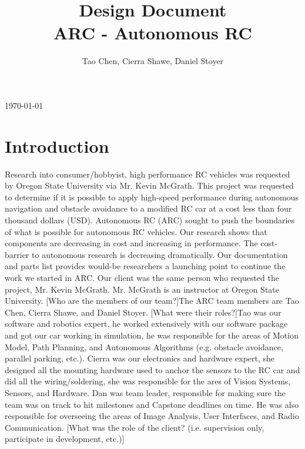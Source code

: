 \documentclass[compsoc,draftclsnofoot,onecolumn,10pt]{IEEEtran}
\date{}
\begin{document}
\begin{titlepage}
	\title{Design Document\\
	ARC - Autonomous RC}
	\author{Tao Chen, Cierra Shawe, Daniel Stoyer}
	\maketitle
	\begin{center}
		\today
	\end{center}

	\thispagestyle{empty} %
	
\end{titlepage}

\tableofcontents

\newpage

\section{Introduction}
Research into consumer/hobbyist, high performance RC vehicles was requested by Oregon State University via Mr. Kevin McGrath. This project was requested to determine if it is possible to apply high-speed performance during autonomous navigation and obstacle avoidance to a modified RC car at a cost less than four thousand dollars (USD). Autonomous RC (ARC) sought to push the boundaries of what is possible for autonomous RC vehicles. Our research shows that components are decreasing in cost and increasing in performance. The cost-barrier to autonomous research is decreasing dramatically. Our documentation and parts list provides would-be researchers a launching point to continue the work we started in ARC. Our client was the same person who requested the project, Mr. Kevin McGrath. Mr. McGrath is an instructor at Oregon State University. [Who are the members of our team?]The ARC team members are Tao Chen, Cierra Shawe, and Daniel Stoyer. [What were their roles?]Tao was our software and robotics expert, he worked extensively with our software package and got our car working in simulation, he was responsible for the areas of Motion Model, Path Planning, and Autonomous Algorithms (e.g. obstacle avoidance, parallel parking, etc.). Cierra was our electronics and hardware expert, she designed all the mounting hardware used to anchor the sensors to the RC car and did all the wiring/soldering, she was responsible for the ares of Vision Systems, Sensors, and Hardware. Dan was team leader, responsible for making sure the team was on track to hit milestones and Capstone deadlines on time. He was also responsible for overseeing the areas of Image Analysis, User Interfaces, and Radio Communication. [What was the role of the client? (i.e. supervision only, participate in development, etc.)]
\end{document}
